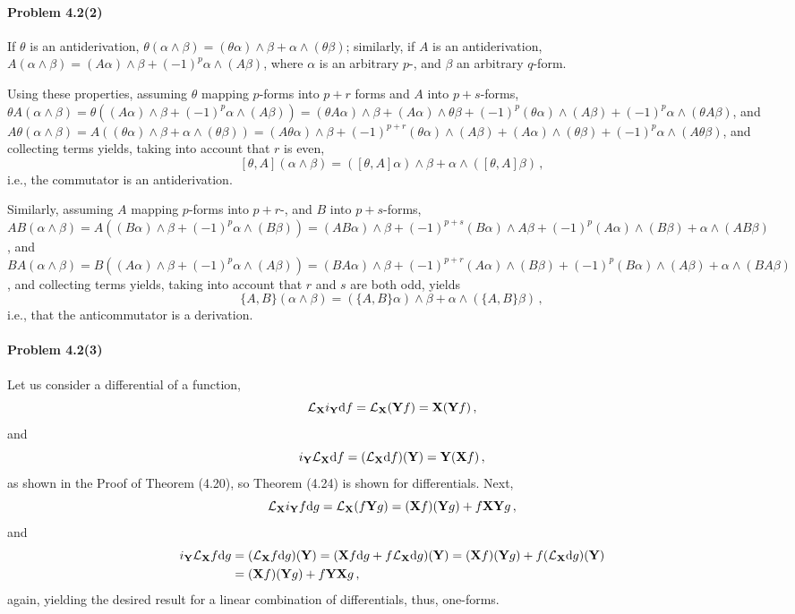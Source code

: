 \documentclass[a4paper,12pt]{article}
\def\d{\mathrm{d}}
\newcommand{\problem}[1]{\paragraph{Problem #1}}
\begin{document}

\problem{4.2(2)} If $\theta$ is an antiderivation, $\theta(\alpha\wedge \beta) = (\theta\alpha)\wedge\beta + \alpha\wedge(\theta\beta)$; similarly, if $A$ is an antiderivation, $A(\alpha\wedge\beta)=(A\alpha)\wedge\beta + (-1)^p \alpha\wedge (A\beta)$, where $\alpha$ is an arbitrary $p$-, and $\beta$ an arbitrary $q$-form.

Using these properties, assuming $\theta$ mapping $p$-forms into $p+r$ forms and $A$ into $p+s$-forms,
$\theta A (\alpha\wedge\beta) = \theta ((A\alpha)\wedge\beta + (-1)^p \alpha\wedge (A\beta)) = (\theta A\alpha)\wedge \beta + (A\alpha)\wedge \theta\beta + (-1)^p (\theta \alpha)\wedge (A\beta) + (-1)^p \alpha \wedge (\theta A\beta)$, and
$A\theta(\alpha\wedge\beta) = A((\theta\alpha)\wedge\beta + \alpha\wedge(\theta\beta)) = (A\theta\alpha)\wedge\beta + (-1)^{p+r} (\theta \alpha) \wedge (A\beta) + (A\alpha)\wedge(\theta\beta) + (-1)^p \alpha \wedge (A\theta\beta)$, and collecting terms yields, taking into account that $r$ is even,
\[
 [\theta, A](\alpha\wedge\beta) = ([\theta, A]\alpha)\wedge \beta + \alpha \wedge ([\theta, A]\beta)\,,
\]
i.e., the commutator is an antiderivation.

Similarly, assuming $A$ mapping $p$-forms into $p+r$-, and $B$ into $p+s$-forms,
$AB (\alpha\wedge\beta) = A ((B\alpha)\wedge\beta + (-1)^p \alpha\wedge (B\beta)) = (A B\alpha)\wedge \beta + (-1)^{p+s}(B\alpha)\wedge A\beta + (-1)^p (A \alpha)\wedge (B\beta) + \alpha \wedge (AB\beta)$
, and
$BA(\alpha\wedge\beta) = B((A\alpha)\wedge\beta + (-1)^p\alpha\wedge(A\beta)) = (BA\alpha)\wedge\beta + (-1)^{p+r} (A \alpha) \wedge (B\beta) + (-1)^p(B\alpha)\wedge(A\beta) + \alpha \wedge (BA\beta)$,
and collecting terms yields, taking into account that $r$ and $s$ are both odd, yields
\[
 \{A, B\}(\alpha\wedge\beta) = (\{A, B\}\alpha)\wedge \beta + \alpha \wedge (\{A, B\}\beta)\,,
\]
i.e., that the anticommutator is a derivation.


\problem{4.2(3)} Let us consider a differential of a function,
\[
 \mathcal{L}_{\bf X} i_{\bf Y}\d f=\mathcal{L}_{\bf X} ({\bf Y}f) = {\bf X}({\bf Y}f)\,,
\]
and
\[
 i_{\bf Y} \mathcal{L}_{\bf X} \d f = (\mathcal{L}_{\bf X}\d f)({\bf Y}) = {\bf Y}({\bf X}f)\,,
\]
as shown in the Proof of Theorem (4.20), so Theorem (4.24) is shown for differentials. Next,
\[
 \mathcal{L}_{\bf X} i_{\bf Y} f\d g = \mathcal{L}_{\bf X}(f {\bf Y}g) = ({\bf X}f)({\bf Y}g) + f {\bf X}{\bf Y}g\,,
\]
and
\[\begin{aligned}
 i_{\bf Y}\mathcal{L}_{\bf X}f\d g &= (\mathcal{L}_{\bf X}f\d g)({\bf Y}) = ({\bf X}f \d g + f\mathcal{L}_{\bf X}\d g)({\bf Y}) = ({\bf X}f)({\bf Y}g)+ f(\mathcal{L}_{\bf X}\d g)({\bf Y})\\ &= ({\bf X}f)({\bf Y}g) + f {\bf Y}{\bf X}g\,,
\end{aligned}\]
again, yielding the desired result for a linear combination of differentials, thus, one-forms.
\end{document}
